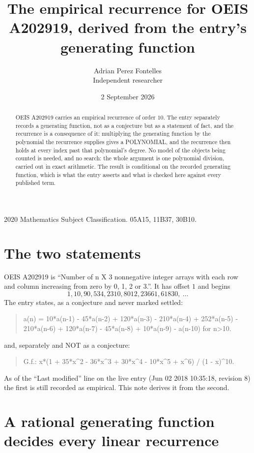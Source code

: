 \documentclass[11pt,a4paper]{article}
\title{The empirical recurrence for OEIS A202919, derived from the entry's generating function}
\author{Adrian Perez Fontelles\\ \small Independent researcher}
\date{2 September 2026}
\theoremstyle{plain}
\theoremstyle{definition}
\begin{document}
\maketitle

\begin{abstract}
OEIS A202919 carries an empirical recurrence of order $10$. The entry separately records a
generating function, not as a conjecture but as a statement of fact, and the recurrence is a
consequence of it: multiplying the generating function by the polynomial the recurrence
supplies gives a POLYNOMIAL, and the recurrence then holds at every index past that
polynomial's degree. No model of the objects being counted is needed, and no search: the
whole argument is one polynomial division, carried out in exact arithmetic. The result is
conditional on the recorded generating function, which is what the entry asserts and what is
checked here against every published term.
\end{abstract}

\noindent\small 2020 Mathematics Subject Classification. 05A15, 11B37, 30B10.\normalsize

\section{The two statements}

OEIS A202919 is ``Number of n X 3 nonnegative integer arrays with each row and column increasing from zero by 0, 1, 2 or 3.''. It has offset $1$ and begins
\[
1, 10, 90, 534, 2310, 8012, 23661, 61830,\ \dots
\]
The entry states, as a conjecture and never marked settled:
\begin{quote}
a(n) = 10*a(n-1) - 45*a(n-2) + 120*a(n-3) - 210*a(n-4) + 252*a(n-5) - 210*a(n-6) + 120*a(n-7) - 45*a(n-8) + 10*a(n-9) - a(n-10) for n>10.
\end{quote}
and, separately and NOT as a conjecture:
\begin{quote}
G.f.: x*(1 + 35*x\^{}2 - 36*x\^{}3 + 30*x\^{}4 - 10*x\^{}5 + x\^{}6) / (1 - x)\^{}10.
\end{quote}
As of the ``Last modified'' line on the live entry (Jun 02 2018 10:35:18, revision 8) the first is still
recorded as empirical. This note derives it from the second.

\section{A rational generating function decides every linear recurrence}
\end{document}
